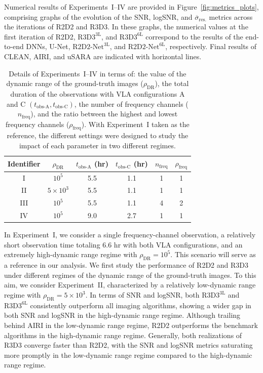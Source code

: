\documentclass[preprint2,twocolumn]{aastex631}
\begin{document}
Numerical results of Experiments~I--IV are provided in Figure~\ref{fig:metrics_plots}, comprising graphs of the evolution of the SNR, logSNR, and $\overline{\sigma}_{\textrm{res.}}$ metrics across the iterations of R2D2 and R3D3. In these graphs, the numerical values at the first iteration of R2D2, $\textrm{R3D3}^{\textrm{3L}}$, and $\textrm{R3D3}^{\textrm{6L}}$ correspond to the results of the end-to-end DNNs, U-Net, $\textrm{R2D2-Net}^{\textrm{3L}}$, and $\textrm{R2D2-Net}^{\textrm{6L}}$, respectively. Final results of CLEAN, AIRI, and uSARA are indicated with horizontal lines.


\begin{table}
 \centering
 \begin{tabular}{cccccc}
 \toprule
 {Identifier} & {$\rho_{\textrm{DR}}$} & {$t_{\textrm{obs-A}}$ (hr)} & {$t_{\textrm{obs-C}}$ (hr)} &{ ${n}_{\textrm{freq}}$} & {$\rho_{\textrm{freq}}$} \\
 \midrule
 I & $10^5$ & 5.5 & 1.1 & 1 & 1 \\
 II & {$5\times 10^3$} & 5.5 & 1.1 & 1 & 1 \\
 III & $10^5$ & 5.5 & 1.1 & 4 & 2 \\
 IV & $10^5$ & 9.0 & 2.7 & 1 & 1 \\
 \bottomrule
 \end{tabular}
\caption{Details of Experiments~I--IV in terms of: the value of the dynamic range of the ground-truth images ($\rho_{\textrm{DR}}$), the total duration of the observations with VLA configurations A and C $(t_{\textrm{obs-A}},t_{\textrm{obs-C}})$, the number of frequency channels ($n_{\textrm{freq}}$), and the ratio between the highest and lowest frequency channels ($\rho_{\textrm{freq}}$). With Experiment~I taken as the reference, the different settings were designed to study the impact of each parameter in two different regimes.}
 \label{table:testset_config}
 \vspace*{-0.3cm}
\end{table}

In Experiment~I, we consider a single frequency-channel observation, a relatively short observation time totaling 6.6 hr with both VLA configurations, and an extremely high-dynamic range regime with $\rho_{\textrm{DR}}=10^5$. This scenario will serve as a reference in our analysis. We first study the performance of R2D2 and R3D3 under different regimes of the dynamic range of the ground-truth images. To this aim, we consider Experiment~II, characterized by a relatively low-dynamic range regime with $\rho_{\textrm{DR}}=5\times 10^3$. In terms of SNR and logSNR, both $\textrm{R3D3}^{\textrm{3L}}$ and $\textrm{R3D3}^{\textrm{6L}}$ consistently outperform all imaging algorithms, showing a wider gap in both SNR and logSNR in the high-dynamic range regime. Although trailing behind AIRI in the low-dynamic range regime, R2D2 outperforms the benchmark algorithms in the high-dynamic range regime. Generally, both realizations of R3D3 converge faster than R2D2, with the SNR and logSNR metrics saturating more promptly in the low-dynamic range regime compared to the high-dynamic range regime.
\end{document}
